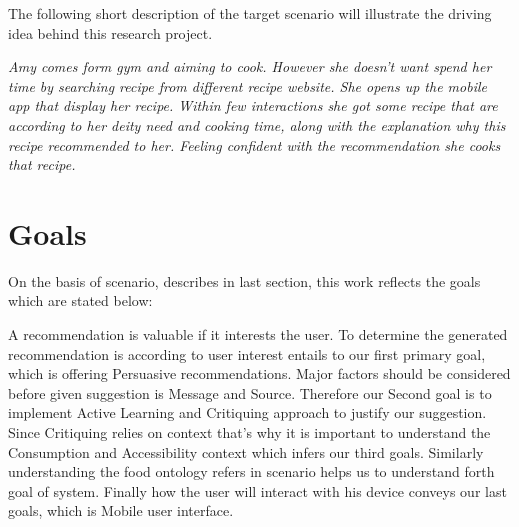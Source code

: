 The following short description of the target scenario will illustrate the driving idea behind this research project.\newline

 \textit{Amy comes form gym and aiming to cook. However she doesn’t want spend her time by searching recipe from different recipe website.  She opens up the mobile app that display her recipe. Within few interactions she got some recipe that are according to her deity need and cooking time, along with the explanation why this recipe recommended to her. Feeling confident with the recommendation she cooks that recipe.}\newline

\section{Goals}

On the basis of scenario, describes in last section, this work reflects the goals which are stated below:\newline

A recommendation is valuable if it interests the user. To determine the generated recommendation is according to user interest entails to our first primary goal, which is offering Persuasive recommendations. Major factors should be considered before given suggestion is Message and Source. Therefore our Second goal is to implement Active Learning and Critiquing approach to justify our suggestion. Since Critiquing relies on context that’s why it is important to understand the Consumption and Accessibility context which infers our third goals.  Similarly understanding the food ontology refers in scenario helps us to understand forth goal of system. Finally how the user will interact with his device conveys our last goals, which is Mobile user interface.\newline

